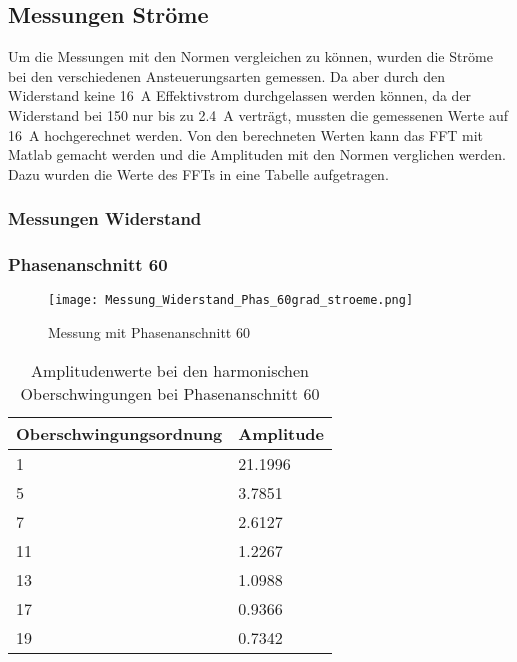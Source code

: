 \newpage
\subsection{Messungen Ströme}
Um die Messungen mit den Normen vergleichen zu können, wurden die Ströme bei den verschiedenen Ansteuerungsarten gemessen. Da aber durch den Widerstand keine \SI{16}{A} Effektivstrom durchgelassen werden können, da der Widerstand bei \SI{150}{\Omega} nur bis zu \SI{2.4}{A} verträgt, mussten die gemessenen Werte auf \SI{16}{A} hochgerechnet werden.
Von den berechneten Werten kann das FFT mit Matlab gemacht werden und die Amplituden mit den Normen verglichen werden. Dazu wurden die Werte des FFTs in eine Tabelle aufgetragen.
\subsubsection{Messungen Widerstand}


\subsubsection*{Phasenanschnitt 60\textdegree}

\begin{figure}[ht!]
	\centering
	\texttt{[image: Messung\_Widerstand\_Phas\_60grad\_stroeme.png]}	
	\caption{Messung mit Phasenanschnitt 60\textdegree}\label{fig:Mess_Widerstand_Phas_60grad_stroeme}
\end{figure}

\begin{table}[ht!]
	\centering
	\begin{tabular}{|l|l|}
		\hline
		Oberschwingungsordnung & Amplitude \\ \hline
		1                      & 21.1996   \\ \hline
		5                      & 3.7851    \\ \hline
		7                      & 2.6127    \\ \hline
		11                     & 1.2267    \\ \hline
		13                     & 1.0988    \\ \hline
		17                     & 0.9366    \\ \hline
		19                     & 0.7342    \\ \hline
	\end{tabular}
\caption{Amplitudenwerte bei den harmonischen Oberschwingungen bei Phasenanschnitt 60\textdegree}\label{tab:Phas_60_Stroeme}
\end{table}


